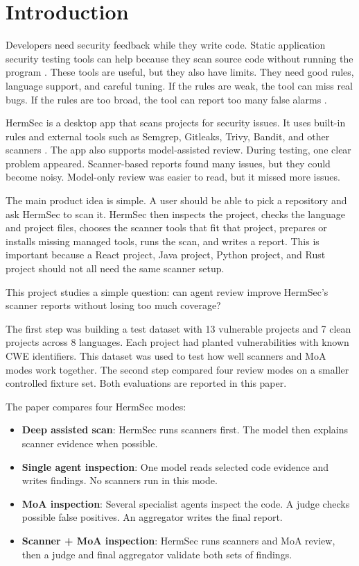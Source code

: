 \documentclass[sigconf,nonacm]{acmart}
\begin{document}
\maketitle

\section{Introduction}
Developers need security feedback while they write code. Static application security testing tools can help because they scan source code without running the program \cite{chess2004static,livshits2005finding}. These tools are useful, but they also have limits. They need good rules, language support, and careful tuning. If the rules are weak, the tool can miss real bugs. If the rules are too broad, the tool can report too many false alarms \cite{zitser2004testing}.

HermSec is a desktop app that scans projects for security issues. It uses built-in rules and external tools such as Semgrep, Gitleaks, Trivy, Bandit, and other scanners \cite{semgrep,gitleaks,trivy,bandit}. The app also supports model-assisted review. During testing, one clear problem appeared. Scanner-based reports found many issues, but they could become noisy. Model-only review was easier to read, but it missed more issues.

The main product idea is simple. A user should be able to pick a repository and ask HermSec to scan it. HermSec then inspects the project, checks the language and project files, chooses the scanner tools that fit that project, prepares or installs missing managed tools, runs the scan, and writes a report. This is important because a React project, Java project, Python project, and Rust project should not all need the same scanner setup.

This project studies a simple question: can agent review improve HermSec's scanner reports without losing too much coverage?

The first step was building a test dataset with 13 vulnerable projects and 7 clean projects across 8 languages. Each project had planted vulnerabilities with known CWE identifiers. This dataset was used to test how well scanners and MoA modes work together. The second step compared four review modes on a smaller controlled fixture set. Both evaluations are reported in this paper.

The paper compares four HermSec modes:

\begin{itemize}
  \item \textbf{Deep assisted scan}: HermSec runs scanners first. The model then explains scanner evidence when possible.
  \item \textbf{Single agent inspection}: One model reads selected code evidence and writes findings. No scanners run in this mode.
  \item \textbf{MoA inspection}: Several specialist agents inspect the code. A judge checks possible false positives. An aggregator writes the final report.
  \item \textbf{Scanner + MoA inspection}: HermSec runs scanners and MoA review, then a judge and final aggregator validate both sets of findings.
\end{itemize}
\end{document}
